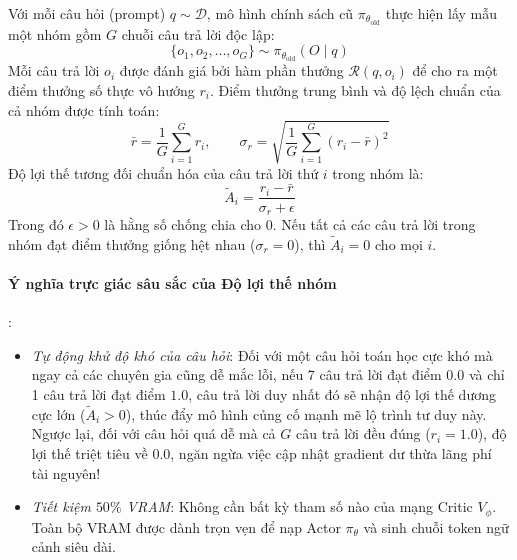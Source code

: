 \begin{definition}
Với mỗi câu hỏi (prompt) $q \sim \mathcal{D}$, mô hình chính sách cũ $\pi_{\theta_{\text{old}}}$ thực hiện lấy mẫu một nhóm gồm $G$ chuỗi câu trả lời độc lập:
\begin{equation}
\{o_1, o_2, \dots, o_G\} \sim \pi_{\theta_{\text{old}}}(O \mid q)
\end{equation}
Mỗi câu trả lời $o_i$ được đánh giá bởi hàm phần thưởng $\mathcal{R}(q, o_i)$ để cho ra một điểm thưởng số thực vô hướng $r_i$. Điểm thưởng trung bình và độ lệch chuẩn của cả nhóm được tính toán:
\begin{equation}
\bar{r} = \frac{1}{G} \sum_{i=1}^G r_i, \qquad \sigma_r = \sqrt{\frac{1}{G} \sum_{i=1}^G (r_i - \bar{r})^2}
\end{equation}
Độ lợi thế tương đối chuẩn hóa của câu trả lời thứ $i$ trong nhóm là:
\begin{equation}
\label{eq:grpo-advantage}
\widetilde{A}_i = \frac{r_i - \bar{r}}{\sigma_r + \epsilon}
\end{equation}
Trong đó $\epsilon > 0$ là hằng số chống chia cho 0. Nếu tất cả các câu trả lời trong nhóm đạt điểm thưởng giống hệt nhau ($\sigma_r = 0$), thì $\widetilde{A}_i = 0$ cho mọi $i$.
\end{definition}

\paragraph{Ý nghĩa trực giác sâu sắc của Độ lợi thế nhóm}:
\begin{itemize}
  \item \textit{Tự động khử độ khó của câu hỏi}: Đối với một câu hỏi toán học cực khó mà ngay cả các chuyên gia cũng dễ mắc lỗi, nếu 7 câu trả lời đạt điểm $0.0$ và chỉ 1 câu trả lời đạt điểm $1.0$, câu trả lời duy nhất đó sẽ nhận độ lợi thế dương cực lớn ($\widetilde{A}_i > 0$), thúc đẩy mô hình củng cố mạnh mẽ lộ trình tư duy này. Ngược lại, đối với câu hỏi quá dễ mà cả $G$ câu trả lời đều đúng ($r_i = 1.0$), độ lợi thế triệt tiêu về $0.0$, ngăn ngừa việc cập nhật gradient dư thừa lãng phí tài nguyên!
  \item \textit{Tiết kiệm $50\%$ VRAM}: Không cần bất kỳ tham số nào của mạng Critic $V_\phi$. Toàn bộ VRAM được dành trọn vẹn để nạp Actor $\pi_\theta$ và sinh chuỗi token ngữ cảnh siêu dài.
\end{itemize}

